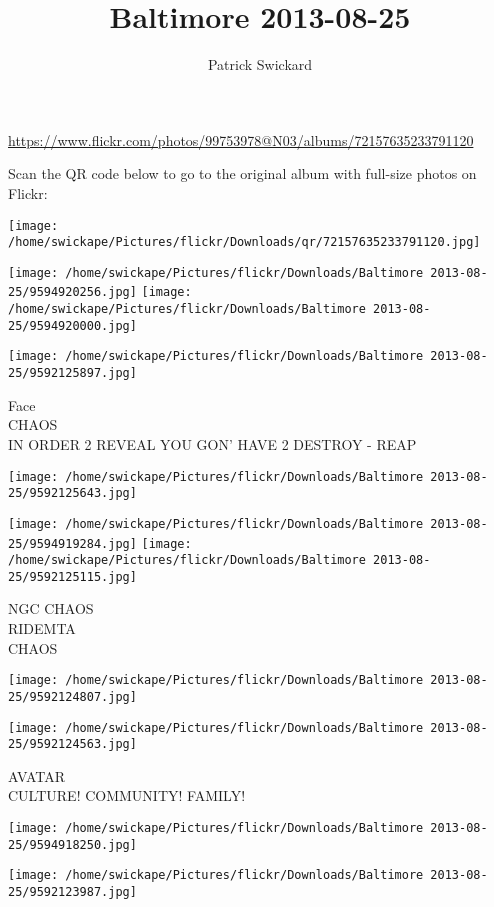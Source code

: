 \documentclass[10pt,letterpaper]{article}
\title{Baltimore 2013-08-25}
\author{Patrick Swickard}
\date{}
\begin{document}
\maketitle

\url{https://www.flickr.com/photos/99753978@N03/albums/72157635233791120}

Scan the QR code below to go to the original album with full-size photos on Flickr:

\texttt{[image: /home/swickape/Pictures/flickr/Downloads/qr/72157635233791120.jpg]}
\pagebreak

\texttt{[image: /home/swickape/Pictures/flickr/Downloads/Baltimore 2013-08-25/9594920256.jpg]}
\texttt{[image: /home/swickape/Pictures/flickr/Downloads/Baltimore 2013-08-25/9594920000.jpg]}

\texttt{[image: /home/swickape/Pictures/flickr/Downloads/Baltimore 2013-08-25/9592125897.jpg]}

Face\\
CHAOS\\
IN ORDER 2 REVEAL YOU GON' HAVE 2 DESTROY {-} REAP
\pagebreak

\texttt{[image: /home/swickape/Pictures/flickr/Downloads/Baltimore 2013-08-25/9592125643.jpg]}

\vspace{0.25in}
\texttt{[image: /home/swickape/Pictures/flickr/Downloads/Baltimore 2013-08-25/9594919284.jpg]}
\texttt{[image: /home/swickape/Pictures/flickr/Downloads/Baltimore 2013-08-25/9592125115.jpg]}

NGC CHAOS\\
RIDEMTA\\
CHAOS
\pagebreak

\texttt{[image: /home/swickape/Pictures/flickr/Downloads/Baltimore 2013-08-25/9592124807.jpg]}

\vspace{0.25in}
\texttt{[image: /home/swickape/Pictures/flickr/Downloads/Baltimore 2013-08-25/9592124563.jpg]}

AVATAR\\
CULTURE! COMMUNITY! FAMILY!
\pagebreak

\texttt{[image: /home/swickape/Pictures/flickr/Downloads/Baltimore 2013-08-25/9594918250.jpg]}

\vspace{0.25in}
\texttt{[image: /home/swickape/Pictures/flickr/Downloads/Baltimore 2013-08-25/9592123987.jpg]}
\end{document}

